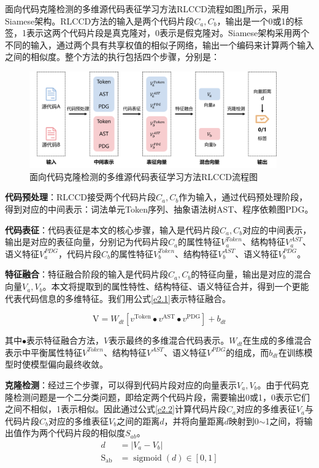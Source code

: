 面向代码克隆检测的多维源代码表征学习方法RLCCD流程如图\ref{fig:flow}所示，采用Siamese架构。RLCCD方法的输入是两个代码片段$C_{a},C_{b}$，输出是一个0或1的标签，1表示这两个代码片段是真克隆对，0表示是假克隆对。Siamese架构采用两个不同的输入，通过两个具有共享权值的相似子网络，输出一个编码来计算两个输入之间的相似度。整个方法的执行包括四个步骤，分别是：
\begin{figure}[H]
    \centering
    \includegraphics[width=0.95\textwidth]{figures/flow}
    \caption{面向代码克隆检测的多维源代码表征学习方法RLCCD流程图}
    \label{fig:flow}
\end{figure}

\textbf{代码预处理}：RLCCD接受两个代码片段$C_{a},C_{b}$作为输入，通过代码预处理阶段，得到对应的中间表示：词法单元Token序列、抽象语法树AST、程序依赖图PDG。

\textbf{代码表征}：代码表征是本文的核心步骤，输入是代码片段$C_{a},C_{b}$对应的中间表示，输出是对应的表征向量，分别记为代码片段$C_{a}$的属性特征$V_{a}^{Token}$、结构特征$V_{a}^{AST}$、语义特征$V_{a}^{PDG}$，代码片段$C_{b}$的属性特征$V_{b}^{Token}$、结构特征$V_{b}^{AST}$、语义特征$V_{b}^{PDG}$。

\textbf{特征融合}：特征融合阶段的输入是代码片段$C_{a},C_{b}$的特征向量，输出是对应的混合向量$V_{a},V_{b}$。本文将提取到的属性特性、结构特征、语义特征合并，得到一个更能代表代码信息的多维特征。我们用公式\ref{e2.1}表示特征融合。

\begin{equation}\label{e2.1}
    \mathrm{V}=W_{dt}\left[v^{\text{Token}} \bullet v^{\text{AST}} \bullet v^{\text{PDG}}\right]+b_{dt}
\end{equation}

其中$\bullet$表示特征融合方法，$V$表示最终的多维混合代码表示。$W_{dt}$在生成的多维混合表示中平衡属性特征$V^{Token}$、结构特征$V^{AST}$、语义特征$V^{PDG}$的组成，而$b_{dt}$在训练模型时使模型偏向最终收敛。

\textbf{克隆检测}：经过三个步骤，可以得到代码片段对应的向量表示$V_{a},V_{b}$。由于代码克隆检测问题是一个二分类问题，即给定两个代码片段，需要输出0或1，0表示它们之间不相似，1表示相似。因此通过公式\ref{e2.2}计算代码片段$C_{a}$对应的多维表征$V_{a}$与代码片段$C_{b}$对应的多维表征$V_{b}$之间的距离$d$，并将向量距离$d$映射到0$\sim$1之间，将输出值作为两个代码片段的相似度$S_{ab}$。
\begin{equation}\label{e2.2}
    \begin{split}
    d &= \left|V_{a}-V_{b}\right| \\
    \mathrm{S_{ab}} &=\operatorname{sigmoid}\left(d\right) \in[0,1]
    \end{split}
\end{equation}

